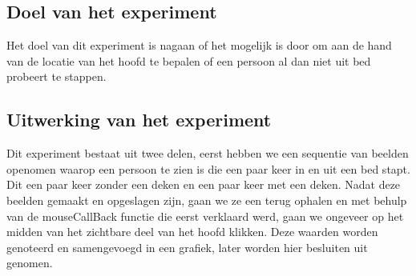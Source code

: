  \subsection{Doel van het experiment}
 \label{ERefHGDD}
 Het doel van dit experiment is nagaan of het mogelijk is door om aan de hand van de locatie van het hoofd te bepalen of een persoon al dan niet uit bed probeert te stappen.
 
 \subsection{Uitwerking van het experiment}
 \label{ERefHGDU}
 Dit experiment bestaat uit twee delen, eerst hebben we een sequentie van beelden openomen waarop een persoon te zien is die een paar keer in en uit een bed stapt. Dit een paar keer zonder een deken en een paar keer met een deken. Nadat deze beelden gemaakt en opgeslagen zijn, gaan we ze een terug ophalen en met behulp van de mouseCallBack functie die eerst verklaard werd, gaan we ongeveer op het midden van het zichtbare deel van het hoofd klikken. Deze waarden worden genoteerd en samengevoegd in een grafiek, later worden hier besluiten uit genomen. 
 
